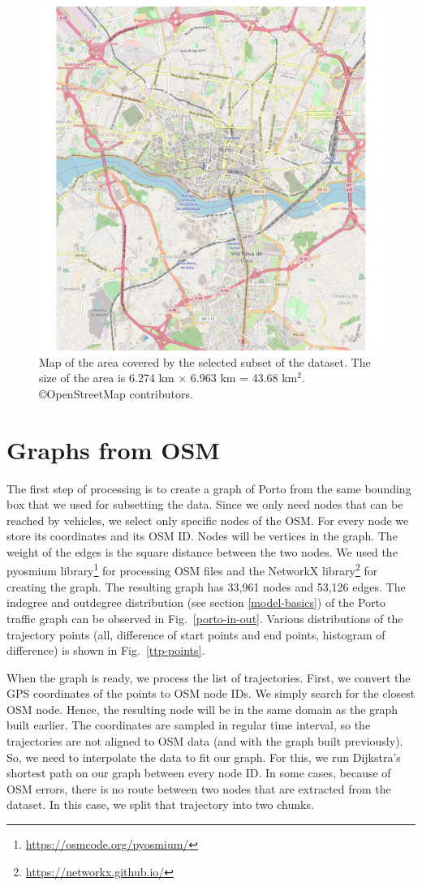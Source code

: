 \documentclass[b5paper,12pt]{report}
\theoremstyle{definition}
\begin{document}
\begin{figure}[t!]
\centering
\includegraphics[width = .7\textwidth]{img/pkdd15_map_subset.pdf}
\caption{Map of the area covered by the selected subset of the dataset. The size of the area is 6.274 km $\times$ 6.963 km = 43.68 km$^2$. \copyright OpenStreetMap contributors.}
\label{porto-map}
\end{figure}
\section{Graphs from OSM}
\label{OSM-graph}

The first step of processing is to create a graph of Porto from the same bounding box that we used for subsetting the data. Since we only need nodes that can be reached by vehicles, we select only specific nodes of the OSM. For every node we store its coordinates and its OSM ID. Nodes will be vertices in the graph. The weight of the edges is the square distance between the two nodes. We used the pyosmium library\footnote{\url{https://osmcode.org/pyosmium/}} for processing OSM files and the NetworkX library\footnote{\url{https://networkx.github.io/}} for creating the graph. The resulting graph has 33,961 nodes and 53,126 edges. The indegree and outdegree distribution (see section \ref{model-basics}) of the Porto traffic graph can be observed in Fig.~\ref{porto-in-out}. Various distributions of the trajectory points (all, difference of start points and end points, histogram of difference) is shown in Fig.~\ref{ttp-points}.

When the graph is ready, we process the list of trajectories. First, we convert the GPS coordinates of the points to OSM node IDs. We simply search for the closest OSM node. Hence, the resulting node will be in the same domain as the graph built earlier. The coordinates are sampled in regular time interval, so the trajectories are not aligned to OSM data (and with the graph built previously). So, we need to interpolate the data to fit our graph. For this, we run Dijkstra's shortest path on our graph between every node ID. In some cases, because of OSM errors, there is no route between two nodes that are extracted from the dataset. In this case, we split that trajectory into two chunks. 
\end{document}
